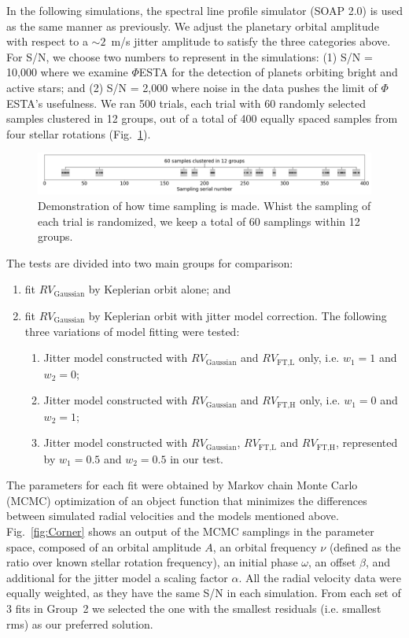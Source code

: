 In the following simulations, the spectral line profile simulator (SOAP 2.0) is used as the same manner as previously. We adjust the planetary orbital amplitude with respect to a $\sim 2$~m/s jitter amplitude to satisfy the three categories above. For S/N, we choose two numbers to represent in the simulations: (1) S/N = 10,000 where we examine $\mathit{\Phi}$ESTA for the detection of planets orbiting bright and active stars; and (2) S/N = 2,000 where noise in the data pushes the limit of $\mathit{\Phi}$ESTA's usefulness. We ran 500 trials, each trial with 60 randomly selected samples clustered in 12 groups, out of a total of 400 equally spaced samples from four stellar rotations (Fig.~\ref{fig:Sampling_demo}). 

\begin{figure}[hbp]
\centering
\includegraphics[width = 0.99 \linewidth]
{./Figures/Methods/Sampling_demo.png}
\caption[How sampling is made]
{Demonstration of how time sampling is made. Whist the sampling of each trial is randomized, we keep a total of 60 samplings within 12 groups.}
\label{fig:Sampling_demo}
\end{figure} 

The tests are divided into two main groups for comparison:
\begin{enumerate}
	\item fit $RV_\text{Gaussian}$ by Keplerian orbit alone; and
	\item fit $RV_\text{Gaussian}$ by Keplerian orbit with jitter model correction. The following three variations of model fitting were tested:
   \begin{enumerate}
     \item Jitter model constructed with $RV_\text{Gaussian}$ and $RV_\text{FT,L}$ only, i.e. $w_1=1$ and $w_2=0$;
     \item Jitter model constructed with $RV_\text{Gaussian}$ and $RV_\text{FT,H}$ only, i.e. $w_1=0$ and $w_2=1$;
     \item Jitter model constructed with $RV_\text{Gaussian}$, $RV_\text{FT,L}$ and $RV_\text{FT,H}$, represented by $w_1=0.5$ and $w_2=0.5$ in our test. 
   \end{enumerate}
\end{enumerate}

The parameters for each fit were obtained by Markov chain Monte Carlo (MCMC) optimization of an object function that minimizes the differences between simulated radial velocities and the models mentioned above. Fig.~\ref{fig:Corner} shows an output of the MCMC samplings in the parameter space, composed of an orbital amplitude $A$, an orbital frequency $\nu$ (defined as the ratio over known stellar rotation frequency), an initial phase $\omega$, an offset $\beta$, and additional for the jitter model a scaling factor $\alpha$. All the radial velocity data were equally weighted, as they have the same S/N in each simulation. From each set of 3 fits in Group~2 we selected the one with the smallest residuals (i.e. smallest rms) as our preferred solution. 

